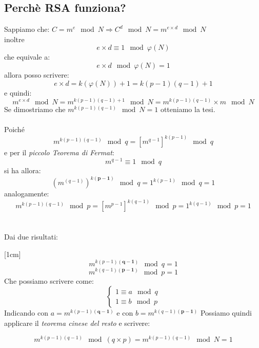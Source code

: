 \documentclass[10pt,a4paper]{article}
\begin{document}
\subsection{Perchè RSA funziona?}
Sappiamo che:
$ \boxed{C=m^e \mod N} \Rightarrow C^d \mod N=m^{e\times d} \mod N$\\ inoltre  \[\boxed{ e\times d \equiv1 \mod \varphi(N)} \] che equivale a:\[ e\times d \mod \varphi(N) =1 \]
allora posso scrivere: \[ e\times d=k(\varphi(N))+1=k(p-1)(q-1)+1 \] e quindi:
\[ m^{e\times d} \mod N=m^{k(p-1)(q-1)+1} 	\mod N=m^{k(p-1)(q-1)}\times m 	\mod N \]
Se dimostriamo che $\boxed{ m^{k(p-1)(q-1)} 	\mod N=1 }$ otteniamo la tesi. 
\\\\
Poiché \[m^{k(p-1)(q-1)} 	\mod q=[m^{q-1}]^{k(p-1)} 	\mod q  \]
e per il \textit{piccolo Teorema di Fermat}: \[\boxed{ m^{q-1} \equiv 1 \mod q} \]
si ha allora: \[ (m^{(q-1)})^{k\mathbf{(p-1)}} 	\mod q=1^{k(p-1)} 	\mod q=1 \] analogamente:
\[m^{k(p-1)(q-1)} 	\mod p=[m^{p-1}]^{k(q-1)} 	\mod p=1^{k(q-1)} \mod p=1  \]
 \\\\
 Dai due risultati:{ 
  	
 } [1cm]
  \[m^{k(p-1)\mathbf{(q-1)}} 	\mod q=1\]  \[  m^{k(q-1)\mathbf{(p-1)}} 	\mod p=1  \]
  Che possiamo scrivere come:
  \[ \left\{
     \begin{array}{rl}
     1\equiv a \mod q\\
     1\equiv b \mod p
     \end{array}
     \right.   \]
     Indicando con $\boxed{a=m^{k(p-1)\mathbf{(q-1)}} } $ e con $ \boxed{b=m^{k(q-1)\mathbf{(p-1)}}} $
 Possiamo quindi applicare  il \textit{teorema cinese del resto}  e   scrivere:
 
 \[ m^{k(p-1)(q-1)} 	\mod (q\times p)= m^{k(p-1)(q-1)} 	\mod N=1 \]  
\end{document}
